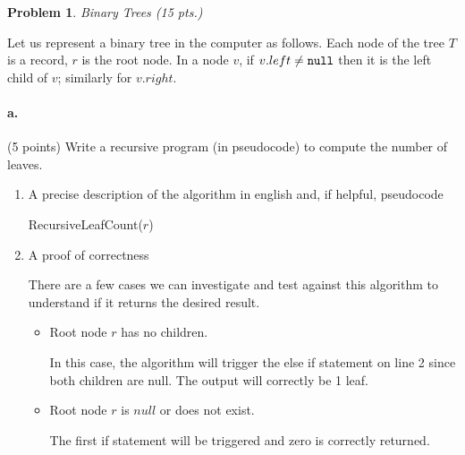 \documentclass[letterpaper,11pt]{article}
\newtheorem{problem}{Problem}
\begin{document}
\newpage
\newcommand{\Null}{\text{\tt null}}
\begin{problem} Binary Trees (15 pts.)
  \end{problem}

Let us represent a binary tree in the computer as follows.
 Each node of the tree $ T$ is a record,  $r $ is the root node.
 In a node $v$, if $v.left \neq \Null$ then it is the left child of $v$;
similarly for $v.right$.



  
  \paragraph{a.} (5 points) Write a recursive program (in pseudocode) to compute the number of leaves.
  
  \begin{enumerate}
      \color{teal}
      \item A precise description of the algorithm in english and, if helpful, 
          pseudocode

        \begin{algorithm}[H]
            \caption{RecursiveLeafCount($r$)} 
        \end{algorithm}


      \item A proof of correctness

          There are a few cases we can investigate and test against this 
          algorithm to understand if it returns the desired result.
          \begin{itemize}
              \item Root node $r$ has no children.

                  In this case, the algorithm will trigger the else if
                  statement on line 2 since both children are null. The output
                  will correctly be 1 leaf.

              \item Root node $r$ is $null$ or does not exist.

                  The first if statement will be triggered and zero is correctly 
                  returned.


\end{itemize}
\end{enumerate}
\end{document}
